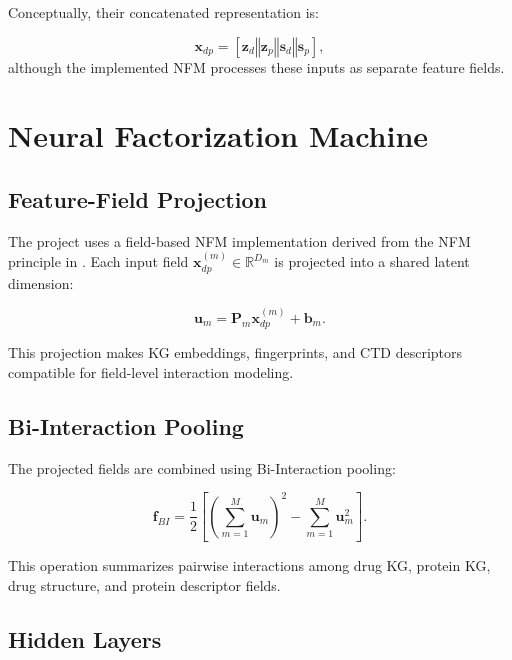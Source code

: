 Conceptually, their concatenated representation is:

\begin{equation}
    \mathbf{x}_{dp}
    =
    [
        \mathbf{z}_{d}
        \mathbin{\Vert}
        \mathbf{z}_{p}
        \mathbin{\Vert}
        \mathbf{s}_{d}
        \mathbin{\Vert}
        \mathbf{s}_{p}
    ],
\end{equation}
although the implemented NFM processes these inputs as separate feature fields.

\section{Neural Factorization Machine}

\subsection{Feature-Field Projection}

The project uses a field-based NFM implementation derived from the NFM
principle in \cite{0001C17}. Each input field
$\mathbf{x}_{dp}^{(m)}\in\mathbb{R}^{D_m}$ is projected into a shared latent
dimension:

\begin{equation}
    \mathbf{u}_{m}
    =
    \mathbf{P}_{m}\mathbf{x}_{dp}^{(m)}+\mathbf{b}_{m}.
    \label{eq:nfm_field_projection}
\end{equation}

This projection makes KG embeddings, fingerprints, and CTD descriptors
compatible for field-level interaction modeling.

\subsection{Bi-Interaction Pooling}

The projected fields are combined using Bi-Interaction pooling:

\begin{equation}
    \mathbf{f}_{BI}
    =
    \frac{1}{2}
    \left[
        \left(
            \sum_{m=1}^{M}\mathbf{u}_{m}
        \right)^2
        -
        \sum_{m=1}^{M}\mathbf{u}_{m}^{2}
    \right].
    \label{eq:nfm_bi_interaction}
\end{equation}

This operation summarizes pairwise interactions among drug KG, protein KG,
drug structure, and protein descriptor fields.

\subsection{Hidden Layers}

